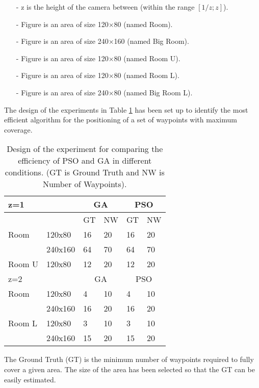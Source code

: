 \begin{itemize}
\item[-]    z is the height of the camera between (within the range $[1/z;z]$).
\item[-]	Figure  is an area of size 120$\times$80 (named Room). 
\item[-]	Figure  is an area of size 240$\times$160 (named Big Room).
\item[-]	Figure  is an area of size 120$\times$80 (named Room U).
\item[-]	Figure  is an area of size 120$\times$80 (named Room L).
\item[-]	Figure  is an area of size 240$\times$80 (named Big Room L).
\end{itemize}


The design of the experiments in Table \ref{table:table1} has been set up to identify the most efficient algorithm for the positioning of a set of waypoints with maximum coverage. 

\begin{table}[!htb]
\begin{tabular}{|l|l|l|l|l|l|}
  \hline
  \multicolumn{2}{|l|}{z=1 } &\multicolumn{2}{|c|}{GA}  & \multicolumn{2}{|c|}{PSO} \\  \hline
  \multicolumn{2}{|c|}{ } & GT & NW & GT & NW\\ \hline
  Room &  120x80 & 16 &20 & 16 & 20\\ \cline{2-6}
     &  240x160 & 64 &70 & 64 & 70 \\ \hline
  Room U &  120x80 & 12 &20 & 12 & 20\\ \hline
  \multicolumn{2}{|l|}{z=2 } &\multicolumn{2}{|c|}{GA}  & \multicolumn{2}{|c|}{PSO} \\  \hline
 Room &  120x80 & 4 &10 & 4 & 10\\ \cline{2-6}
     &  240x160 & 16 &20 & 16 & 20 \\ \hline
 Room L&  120x80 & 3 &10 & 3 & 10\\ \cline{2-6}
     &  240x160 & 15 &20 & 15 & 20 \\ \hline
\end{tabular}
\caption{Design of the experiment for comparing the efficiency of PSO and GA in different conditions.  (GT is Ground Truth and NW is Number of Waypoints).}\label{table:table1}
\end{table}

The Ground Truth (GT) is the minimum number of waypoints required to fully cover a given area. The size of the area has been selected so that the GT can be easily estimated. 

